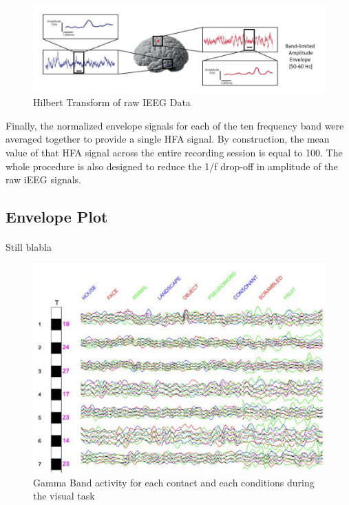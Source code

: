 \documentclass[a4paper]{article}
\begin{document}
\begin{figure}[H]
\begin{center}
\includegraphics[scale=0.4]{HilbertProcessing.png}
\end{center}
\caption{\label{HilbertProcessingPicture}Hilbert Transform of raw IEEG Data}
\end{figure}

Finally, the normalized envelope signals for each of the ten frequency band were averaged together to provide a single HFA signal. By construction, the mean value of that HFA signal across the entire recording session is equal to 100. The whole procedure is also designed to reduce the 1/f drop‐off in amplitude of the raw iEEG signals. 

\subsection{Envelope Plot}
\paragraph{} Still blabla
\begin{figure}[H]
\begin{center}
\includegraphics[scale=0.8]{EnvelopePlots.png}
\end{center}
\caption{\label{EnvelopePlotsPicture}Gamma Band activity for each contact and each conditions during the visual task}
\end{figure}
\end{document}
